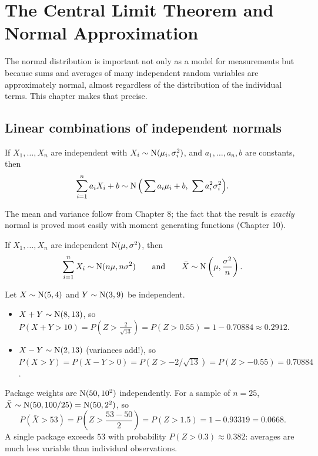 \chapter{The Central Limit Theorem and Normal Approximation}

The normal distribution is important not only as a model for measurements but because
sums and averages of many independent random variables are approximately normal, almost
regardless of the distribution of the individual terms. This chapter makes that precise.

\section{Linear combinations of independent normals}

\begin{theorem}
If $X_1,\dots,X_n$ are independent with $X_i\sim\operatorname{N}(\mu_i,\sigma_i^2)$, and
$a_1,\dots,a_n, b$ are constants, then
\[
  \sum_{i=1}^n a_iX_i + b \sim \operatorname{N}\Big(\sum a_i\mu_i + b,\ \sum a_i^2\sigma_i^2\Big).
\]
\end{theorem}

The mean and variance follow from Chapter 8; the fact that the result is \emph{exactly}
normal is proved most easily with moment generating functions (Chapter 10).

\begin{corollary}
If $X_1,\dots,X_n$ are independent $\operatorname{N}(\mu,\sigma^2)$, then
\[
  \sum_{i=1}^n X_i\sim\operatorname{N}(n\mu, n\sigma^2) \qquad\text{and}\qquad
  \bar X\sim\operatorname{N}\left(\mu, \frac{\sigma^2}{n}\right).
\]
\end{corollary}

\begin{example}
Let $X\sim\operatorname{N}(5,4)$ and $Y\sim\operatorname{N}(3,9)$ be independent.
\begin{itemize}
  \item $X + Y\sim\operatorname{N}(8, 13)$, so
        $P(X+Y>10) = P\left(Z > \frac{2}{\sqrt{13}}\right) = P(Z > 0.55)
        = 1 - 0.70884 \approx 0.2912$.
  \item $X - Y\sim\operatorname{N}(2, 13)$ (variances add!), so
        $P(X > Y) = P(X - Y > 0) = P(Z > -2/\sqrt{13}) = P(Z > -0.55) = 0.70884$.
\end{itemize}
\end{example}

\begin{example}
Package weights are $\operatorname{N}(50, 10^2)$ independently. For a sample of $n=25$,
$\bar X\sim\operatorname{N}(50, 100/25) = \operatorname{N}(50, 2^2)$, so
\[
  P(\bar X > 53) = P\left(Z > \frac{53-50}{2}\right) = P(Z > 1.5) = 1 - 0.93319 = 0.0668.
\]
A single package exceeds $53$ with probability $P(Z > 0.3) \approx 0.382$: averages are
much less variable than individual observations.
\end{example}


